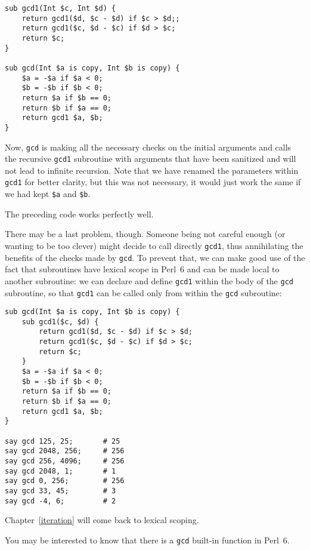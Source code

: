 \begin{verbatim}
sub gcd1(Int $c, Int $d) {
    return gcd1($d, $c - $d) if $c > $d;;
    return gcd1($c, $d - $c) if $d > $c;
    return $c;
}

sub gcd(Int $a is copy, Int $b is copy) { 
    $a = -$a if $a < 0;
    $b = -$b if $b < 0;
    return $a if $b == 0;
    return $b if $a == 0;
    return gcd1 $a, $b;
}
\end{verbatim}
%

Now, {\tt gcd} is making all the necessary checks on the 
initial arguments and calls the recursive {\tt gcd1} 
subroutine with arguments that have been sanitized and 
will not lead to infinite recursion. Note that we have 
renamed the parameters within {\tt gcd1} for better 
clarity, but this was not necessary, it would just work 
the same if we had kept {\tt \$a} and {\tt \$b}.

The preceding code works perfectly well.

There may be a last problem, though. Someone being not 
careful enough (or wanting to be too clever) might decide 
to call directly {\tt gcd1}, thus annihilating the benefits 
of the checks made by {\tt gcd}. To prevent that, we can make good 
use of the fact that subroutines have lexical scope in Perl~6 
and can be made local to another subroutine: we can declare 
and define {\tt gcd1} within the body of the {\tt gcd} 
subroutine, so that {\tt gcd1} can be called only from 
within the {\tt gcd} subroutine:

\begin{verbatim}
sub gcd(Int $a is copy, Int $b is copy) { 
    sub gcd1($c, $d) {
        return gcd1($d, $c - $d) if $c > $d;
        return gcd1($c, $d - $c) if $d > $c;
        return $c;
    }
    $a = -$a if $a < 0;
    $b = -$b if $b < 0;
    return $a if $b == 0;
    return $b if $a == 0;
    return gcd1 $a, $b;
}

say gcd 125, 25;       # 25
say gcd 2048, 256;     # 256
say gcd 256, 4096;     # 256
say gcd 2048, 1;       # 1
say gcd 0, 256;        # 256
say gcd 33, 45;        # 3
say gcd -4, 6;         # 2
\end{verbatim}

Chapter~\ref{iteration} will come back to lexical scoping.


You may be interested to know that there is a {\tt gcd} built-in 
function in Perl~6.


